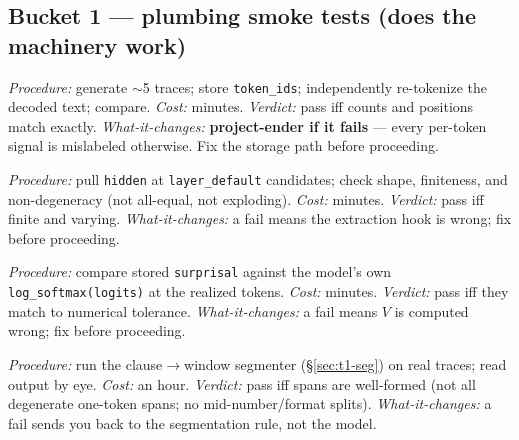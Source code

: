 \documentclass[11pt]{article}
\newcommand{\out}[1]{\texttt{#1}}      %
\newcommand{\param}[1]{\texttt{#1}}    %
\begin{document}
\subsection{Bucket 1 --- plumbing smoke tests (does the machinery work)}
\label{sec:t0-smoke}
\begin{description}[leftmargin=1.2em,style=nextline]
\item[\out{alignment\_ok} --- token-alignment integrity]
\emph{Procedure:} generate $\sim$5 traces; store \out{token\_ids}; independently
re-tokenize the decoded text; compare. \emph{Cost:} minutes.
\emph{Verdict:} pass iff counts and positions match exactly. \emph{What-it-changes:}
\textbf{project-ender if it fails} --- every per-token signal is mislabeled
otherwise. Fix the storage path before proceeding.
\item[hidden-state sanity]
\emph{Procedure:} pull \out{hidden} at \param{layer\_default} candidates; check
shape, finiteness, and non-degeneracy (not all-equal, not exploding).
\emph{Cost:} minutes. \emph{Verdict:} pass iff finite and varying.
\emph{What-it-changes:} a fail means the extraction hook is wrong; fix before
proceeding.
\item[surprisal cross-check]
\emph{Procedure:} compare stored \out{surprisal} against the model's own
\texttt{log\_softmax(logits)} at the realized tokens. \emph{Cost:} minutes.
\emph{Verdict:} pass iff they match to numerical tolerance.
\emph{What-it-changes:} a fail means $V$ is computed wrong; fix before proceeding.
\item[segmenter sanity]
\emph{Procedure:} run the clause$\to$window segmenter (\S\ref{sec:t1-seg}) on real
traces; read output by eye. \emph{Cost:} an hour. \emph{Verdict:} pass iff spans
are well-formed (not all degenerate one-token spans; no mid-number/format splits).
\emph{What-it-changes:} a fail sends you back to the segmentation rule, not the
model.
\end{description}
\end{document}
